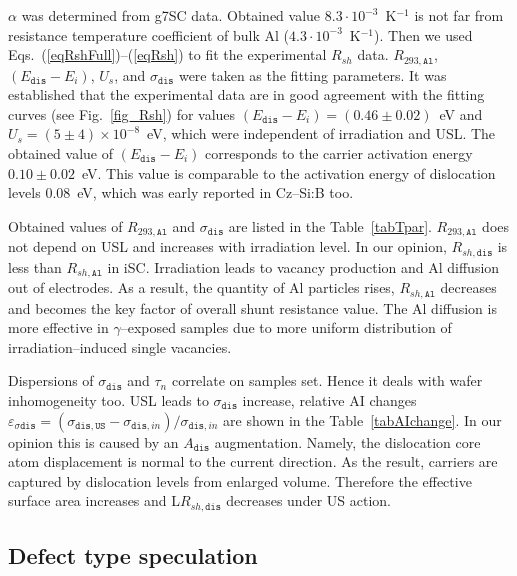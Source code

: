 \documentclass[aip,jap, amsmath,amssymb,reprint]{revtex4-1}
\begin{document}
$\alpha$ was determined from g7SC data.
Obtained value $8.3\cdot10^{-3}$~K$^{-1}$ is not far from resistance temperature coefficient of bulk Al ($4.3\cdot10^{-3}$~K$^{-1}$).
Then we used Eqs.~(\ref{eqRshFull})--(\ref{eqRsh}) to fit the experimental $R_{sh}$ data.
$R_{293,\mathtt{Al}}$, $(E_{\mathtt{dis}}-E_i)$, $U_s$, and $\sigma_{\mathtt{dis}}$ were taken as the fitting parameters.
It was established that the experimental data are in good agreement with the fitting curves (see Fig.~\ref{fig_Rsh}) for values $(E_{\mathtt{dis}}-E_i)=(0.46\pm0.02)$~eV and $U_s=(5\pm4)\times10^{-8}$~eV, which were independent of irradiation and USL.
The obtained value of $(E_{\mathtt{dis}}-E_i)$ corresponds to the carrier activation energy $0.10\pm0.02$~eV.
This value is comparable to the
activation energy of dislocation levels $0.08$~eV,
which was early reported\cite{disl10:Castaldini,disl10:Isakova,disl10:Yu,disl10:Kveder,disl10:Trushin}
in Cz--Si:B too.\cite{disl10:Castaldini,disl10:Isakova,disl10:Yu}



Obtained values of $R_{293,\mathtt{Al}}$ and $\sigma_{\mathtt{dis}}$ are listed in the Table~\ref{tabTpar}.
$R_{293,\mathtt{Al}}$ does not depend on USL and increases with irradiation level.
In our opinion, $R_{sh,\mathtt{dis}}$ is less than $R_{sh,\mathtt{Al}}$ in iSC.
Irradiation leads to vacancy production and Al diffusion out of electrodes.
As a result, the quantity of Al particles rises, $R_{sh,\mathtt{Al}}$ decreases and becomes the key factor of overall shunt resistance value.
The Al diffusion is more effective in $\gamma$--exposed samples due to more uniform distribution of irradiation--induced single vacancies.

Dispersions of $\sigma_{\mathtt{dis}}$ and $\tau_n$ correlate on samples set.
Hence it deals with wafer inhomogeneity too.
USL leads to $\sigma_{\mathtt{dis}}$ increase, relative AI changes
$\varepsilon_{\sigma\mathtt{dis}}=(\sigma_{\mathtt{dis,US}}-\sigma_{\mathtt{dis},in})/\sigma_{\mathtt{dis},in}$
are shown in the Table~\ref{tabAIchange}.
In our opinion this is caused by an $A_\mathtt{dis}$ augmentation.
Namely, the dislocation core atom displacement  is  normal to the  current direction.
As the result, carriers are captured by dislocation levels from enlarged volume.
Therefore the effective surface area increases and L$R_{sh,\mathtt{dis}}$ decreases under US action.


\subsection{Defect type speculation\label{DefectType}}
\end{document}
